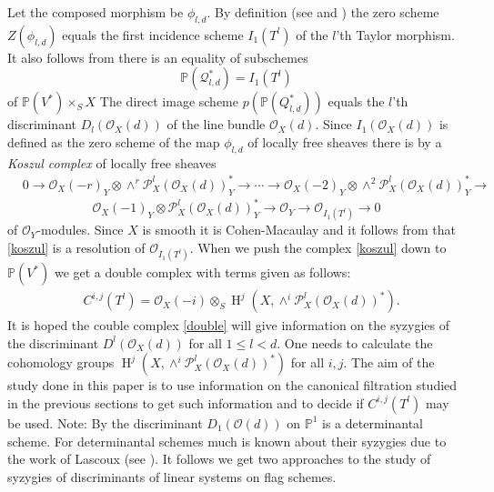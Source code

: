 \documentclass{amsart}
\theoremstyle{plain}
\theoremstyle{definition}
\theoremstyle{remark}
\numberwithin{equation}{theorem}
\begin{document}
Let the composed morphism be $\phi_{l,d}$.
By definition (see \cite{maa09} and \cite{maa10}) the zero scheme
$Z(\phi_{l,d})$ equals the first incidence scheme $I_1(T^l)$ of the
$l$'th Taylor morphism. It also follows from \cite{maa10} there is an equality of subschemes
\[ {\mathbb{P}}({\mathcal{Q}}_{l,d}^*)=I_1(T^l)\]
of ${\mathbb{P}}(V^*)\times_S X$
The direct image scheme $p({\mathbb{P}}(Q_{l,d}^*))$ equals the $l$'th
discriminant $D_l({\mathcal{O} }_X(d))$ of the line bundle ${\mathcal{O} }_X(d)$. Since
$I_1({\mathcal{O} }_X(d))$ is defined 
as the zero scheme of the map $\phi_{l,d}$ of locally free sheaves
there is by \cite{maa09} a \emph{Koszul complex} of locally free sheaves
\begin{align}
&\label{koszul} 0\rightarrow {\mathcal{O} }_X(-r)_Y\otimes \wedge^r
{\mathcal{P} }^l_X({\mathcal{O} }_X(d))_Y^*\rightarrow \cdots \rightarrow {\mathcal{O} }_X(-2)_Y\otimes
\wedge^2 {\mathcal{P} }^l_X({\mathcal{O} }_X(d))_Y^*\rightarrow 
\end{align}
\[ {\mathcal{O} }_X(-1)_Y\otimes {\mathcal{P} }^l_X({\mathcal{O} }_X(d))_Y^*\rightarrow {\mathcal{O} }_Y \rightarrow
{\mathcal{O} }_{I_1(T^l)}\rightarrow 0 \]
of ${\mathcal{O} }_Y$-modules.
Since $X$ is smooth it is Cohen-Macaulay and it follows from \cite{maa09} that \ref{koszul} is
a resolution of ${\mathcal{O} }_{I_1(T^l)}$. When we push the complex
\ref{koszul} down to ${\mathbb{P}}(V^*)$ we get
a double complex with terms given as follows:
\begin{align}
&\label{double}  C^{i,j}(T^l)={\mathcal{O} }_X(-i)\otimes_S {\operatorname{H} }^j(X,\wedge^i
{\mathcal{P} }^l_X({\mathcal{O} }_X(d))^*).
\end{align}
It is hoped the couble complex \ref{double} will give information on
the syzygies of the discriminant $D^l({\mathcal{O} }_X(d))$ for all  $1\leq l <d$.
One needs to calculate the cohomology groups ${\operatorname{H} }^j(X,\wedge^i
{\mathcal{P} }^l_X({\mathcal{O} }_X(d))^*)$ for all $i,j$. The aim of the study done in this
paper is to use  information on the canonical filtration studied in the previous
sections to get such information and to decide if $C^{i,j}(T^l)$ may
be used. Note: By \cite{maa10} the discriminant $D_1({\mathcal{O} }(d))$ on ${\mathbb{P}}^1$
is a determinantal scheme. For determinantal schemes much is known
about their syzygies due to the work of Lascoux (see
\cite{lascoux}). It follows we get two approaches to the study of
syzygies of discriminants of linear systems on flag schemes.
 
\end{document}
